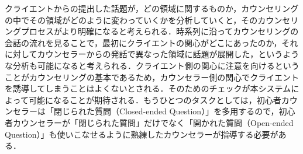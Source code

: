 \documentclass[shuuron]{kuee}
\begin{document}
クライエントからの提出した話題が，どの領域に関するものか，カウンセリングの中でその領域がどのように変わっていくかを分析していくと，そのカウンセリングプロセスがより明確になると考えられる．時系列に沿ってカウンセリングの会話の流れを見ることで，最初にクライエントの関心がどこにあったのか，それに対してカウンセラーからの発話で異なった領域に話題が展開した，というような分析も可能になると考えられる．クライエント側の関心に注意を向けるということがカウンセリングの基本であるため，カウンセラー側の関心でクライエントを誘導してしまうことはよくないとされる．そのためのチェックが本システムによって可能になることが期待される．もうひとつのタスクとしては，初心者カウンセラーは「閉じられた質問（Closed-ended Question）」を多用するので，初心者カウンセラーが「閉じられた質問」だけでなく「開かれた質問（Open-ended Question）」も使いこなせるように熟練したカウンセラーが指導する必要がある．%



%



\end{document}
